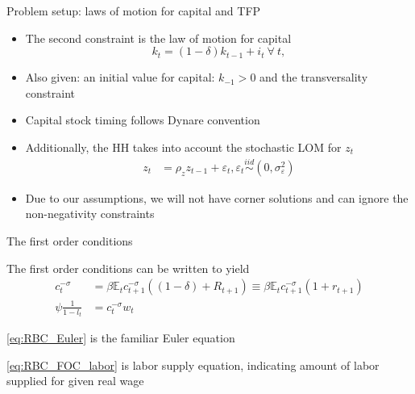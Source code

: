 \documentclass[handout,usepdftitle=false,xcolor=dvipsnames,aspectratio=169]{beamer}
\begin{document}
\begin{frame}{Problem setup: laws of motion for capital and TFP}
\begin{itemize}
    \item The second constraint is the law of motion for capital
        \begin{equation}
         k_{t}= (1-\delta) k_{t-1} +i_t \: \forall \: t ,
        \end{equation}
    \item Also given: an initial value for capital: $k_{-1}>0$ and the transversality constraint
    \item Capital stock timing follows Dynare convention
    \item Additionally, the HH takes into account the stochastic LOM for $z_t$
    \begin{align}
      z_t &= \rho_z z_{t-1} + \varepsilon_t, \varepsilon_t \overset{iid}{\sim} \left( {0,\sigma_\varepsilon ^2} \right) \label{eq:LOM_TFP1}
    \end{align}
    \item Due to our assumptions, we will not have corner solutions and can ignore the non-negativity constraints
\end{itemize}
\end{frame}

\begin{frame}{The first order conditions}
\begin{witemize}
\item The first order conditions can be written to yield
\begin{align}
  c_t^{ - \sigma } &= \beta { \mathbb{E}_t}c_{t + 1}^{ - \sigma }\left(\left( 1 - \delta \right) + R_{t + 1}\right) \equiv \beta {\mathbb{E}_t}c_{t + 1}^{ - \sigma }\left(1+r_{t+1}\right) \label{eq:RBC_Euler}\\
  \psi \frac{1}{1-l_t} &= c_t^{ - \sigma }{w_t} \label{eq:RBC_FOC_labor}
\end{align}
\item \eqref{eq:RBC_Euler} is the familiar Euler equation
\item \eqref{eq:RBC_FOC_labor} is labor supply equation, indicating amount of labor supplied for given real wage
\end{witemize}
\end{frame}
\end{document}
